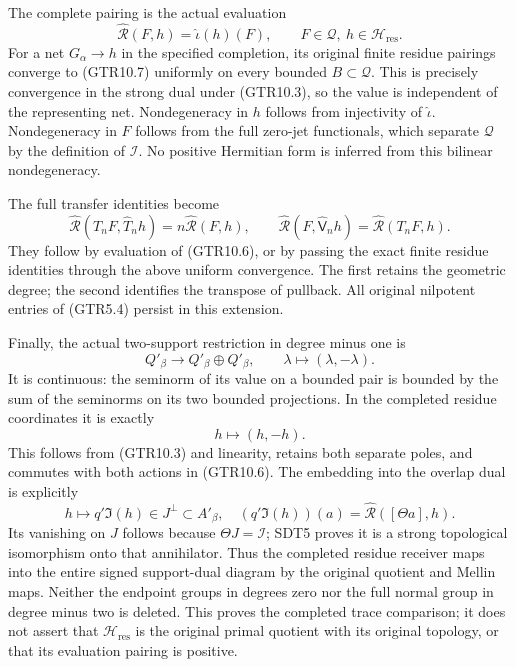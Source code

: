 The complete pairing is the actual evaluation \[
\widehat{\mathcal R}(F,h)=\widehat\iota(h)(F),
\qquad F\in\mathcal Q,\ h\in\mathcal H_{\mathrm{res}}.
\tag{GTR10.7}
\] For a net \(G_\alpha\to h\) in the specified completion, its original
finite residue pairings converge to (GTR10.7) uniformly on every bounded
\(B\subset\mathcal Q\). This is precisely convergence in the strong dual
under (GTR10.3), so the value is independent of the representing net.
Nondegeneracy in \(h\) follows from injectivity of \(\widehat\iota\).
Nondegeneracy in \(F\) follows from the full zero-jet functionals, which
separate \(\mathcal Q\) by the definition of \(\mathcal I\). No positive
Hermitian form is inferred from this bilinear nondegeneracy.

The full transfer identities become \[
\widehat{\mathcal R}(T_nF,\widehat T_nh)
=n\widehat{\mathcal R}(F,h),\qquad
\widehat{\mathcal R}(F,\widehat{\mathsf V}_nh)
=\widehat{\mathcal R}(T_nF,h).
\tag{GTR10.8}
\] They follow by evaluation of (GTR10.6), or by passing the exact
finite residue identities through the above uniform convergence. The
first retains the geometric degree; the second identifies the transpose
of pullback. All original nilpotent entries of (GTR5.4) persist in this
extension.

Finally, the actual two-support restriction in degree minus one is \[
Q'_\beta\longrightarrow Q'_\beta\oplus Q'_\beta,
\qquad\lambda\longmapsto(\lambda,-\lambda).
\tag{GTR10.9}
\] It is continuous: the seminorm of its value on a bounded pair is
bounded by the sum of the seminorms on its two bounded projections. In
the completed residue coordinates it is exactly \[
h\longmapsto(h,-h).
\tag{GTR10.10}
\] This follows from (GTR10.3) and linearity, retains both separate
poles, and commutes with both actions in (GTR10.6). The embedding into
the overlap dual is explicitly \[
h\longmapsto q'\mathfrak I(h)\in J^\perp\subset A'_\beta,
\quad
(q'\mathfrak I(h))(a)=\widehat{\mathcal R}([\Theta a],h).
\tag{GTR10.11}
\] Its vanishing on \(J\) follows because \(\Theta J=\mathcal I\); SDT5
proves it is a strong topological isomorphism onto that annihilator.
Thus the completed residue receiver maps into the entire signed
support-dual diagram by the original quotient and Mellin maps. Neither
the endpoint groups in degrees zero nor the full normal group in degree
minus two is deleted. This proves the completed trace comparison; it
does not assert that \(\mathcal H_{\mathrm{res}}\) is the original
primal quotient with its original topology, or that its evaluation
pairing is positive.

